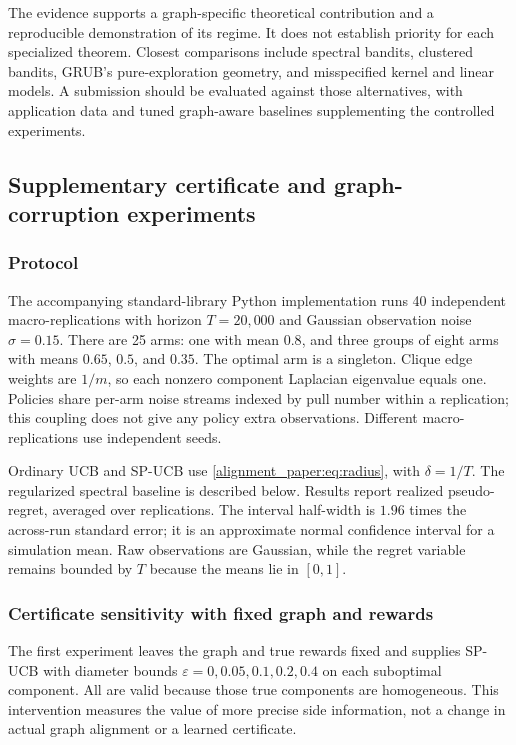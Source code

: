 The evidence supports a graph-specific theoretical contribution and a reproducible demonstration of its regime. It does not establish priority for each specialized theorem. Closest comparisons include spectral bandits, clustered bandits, GRUB's pure-exploration geometry, and misspecified kernel and linear models. A submission should be evaluated against those alternatives, with application data and tuned graph-aware baselines supplementing the controlled experiments.


\subsection{Supplementary certificate and graph-corruption experiments}
\subsubsection{Protocol}
The accompanying standard-library Python implementation runs 40 independent macro-replications with horizon $T=20{,}000$ and Gaussian observation noise $\sigma=0.15$. There are 25 arms: one with mean $0.8$, and three groups of eight arms with means $0.65$, $0.5$, and $0.35$. The optimal arm is a singleton. Clique edge weights are $1/m$, so each nonzero component Laplacian eigenvalue equals one. Policies share per-arm noise streams indexed by pull number within a replication; this coupling does not give any policy extra observations. Different macro-replications use independent seeds.

Ordinary UCB and SP-UCB use \eqref{alignment_paper:eq:radius}, with $\delta=1/T$. The regularized spectral baseline is described below. Results report realized pseudo-regret, averaged over replications. The interval half-width is $1.96$ times the across-run standard error; it is an approximate normal confidence interval for a simulation mean. Raw observations are Gaussian, while the regret variable remains bounded by $T$ because the means lie in $[0,1]$.

\subsubsection{Certificate sensitivity with fixed graph and rewards}
The first experiment leaves the graph and true rewards fixed and supplies SP-UCB with diameter bounds $\varepsilon=0,0.05,0.1,0.2,0.4$ on each suboptimal component. All are valid because those true components are homogeneous. This intervention measures the value of more precise side information, not a change in actual graph alignment or a learned certificate.

